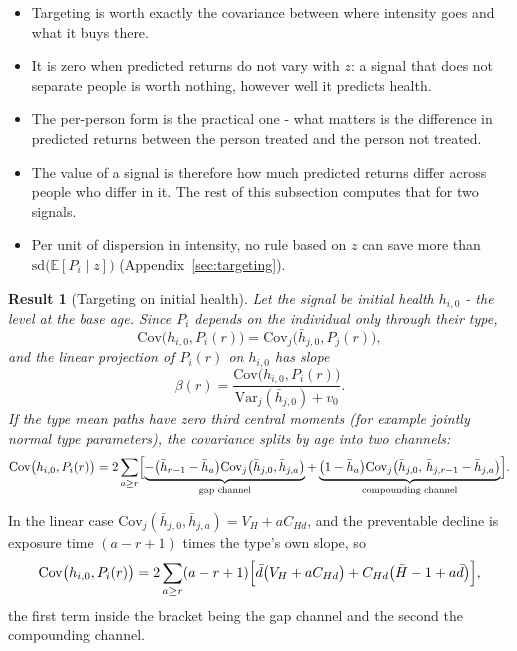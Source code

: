 \documentclass[11pt]{article}
\newtheorem{result}{Result}
\theoremstyle{remark}
\newcommand{\E}{\mathbb{E}}
\newcommand{\Var}{\mathrm{Var}}
\newcommand{\Cov}{\mathrm{Cov}}
\begin{document}
\begin{itemize}
\item Targeting is worth exactly the covariance between where intensity goes and what it buys there.
\item It is zero when predicted returns do not vary with $z$: a signal that does not separate people is worth nothing, however well it predicts health.
\item The per-person form is the practical one - what matters is the difference in predicted returns between the person treated and the person not treated.
\item The value of a signal is therefore how much predicted returns differ across people who differ in it. The rest of this subsection computes that for two signals.
\item Per unit of dispersion in intensity, no rule based on $z$ can save more than $\mathrm{sd}\bigl(\E[P_i\mid z]\bigr)$ (Appendix~\ref{sec:targeting}).
\end{itemize}

\begin{result}[Targeting on initial health]\label{res:target}
Let the signal be initial health $h_{i,0}$ - the level at the base age. Since $P_i$ depends on the individual only through their type,
\begin{equation}
\Cov\bigl(h_{i,0},P_i(r)\bigr)=\Cov_j\bigl(\bar h_{j,0},P_j(r)\bigr),
\end{equation}
and the linear projection of $P_i(r)$ on $h_{i,0}$ has slope
\begin{equation}
\beta(r)=\frac{\Cov\bigl(h_{i,0},P_i(r)\bigr)}{\Var_j(\bar h_{j,0})+v_0}.
\label{eq:beta0}
\end{equation}
If the type mean paths have zero third central moments (for example jointly normal type parameters), the covariance splits by age into two channels:
\begin{equation}
\Cov\bigl(h_{i,0},P_i(r)\bigr)=2\sum_{a\ge r}\Bigl[
\underbrace{-\bigl(\bar h_{r-1}-\bar h_a\bigr)\Cov_j\bigl(\bar h_{j,0},\bar h_{j,a}\bigr)}_{\text{gap channel}}
+\underbrace{\bigl(1-\bar h_a\bigr)\Cov_j\bigl(\bar h_{j,0},\,\bar h_{j,r-1}-\bar h_{j,a}\bigr)}_{\text{compounding channel}}\Bigr].
\label{eq:G0}
\end{equation}
\end{result}

In the linear case $\Cov_j(\bar h_{j,0},\bar h_{j,a})=V_H+aC_{Hd}$, and the preventable decline is exposure time $(a-r+1)$ times the type's own slope, so
\begin{equation}
\Cov\bigl(h_{i,0},P_i(r)\bigr)
=2\sum_{a\ge r}(a-r+1)\Bigl[\bar d\bigl(V_H+aC_{Hd}\bigr)+C_{Hd}\bigl(\bar H-1+a\bar d\bigr)\Bigr],
\label{eq:G0lin}
\end{equation}
the first term inside the bracket being the gap channel and the second the compounding channel.
\end{document}
